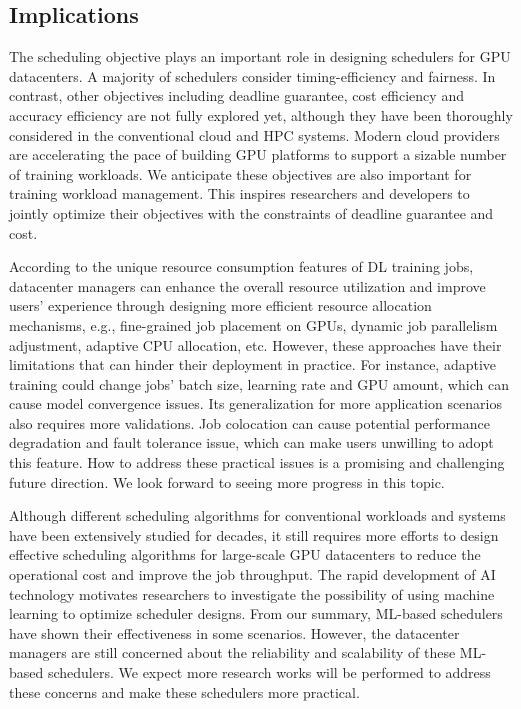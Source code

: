\subsection{Implications}
The scheduling objective plays an important role in designing schedulers for GPU datacenters. A majority of schedulers consider timing-efficiency and fairness. In contrast, other objectives including deadline guarantee, cost efficiency and accuracy efficiency are not fully explored yet, although they have been thoroughly considered in the conventional cloud and HPC systems. Modern cloud providers are accelerating the pace of building GPU platforms to support a sizable number of training workloads. We anticipate these objectives are also important for training workload management. This inspires researchers and developers to jointly optimize their objectives with the constraints of deadline guarantee and cost.



According to the unique resource consumption features of DL training jobs, datacenter managers can enhance the overall resource utilization and improve users' experience through designing more efficient resource allocation mechanisms, e.g., fine-grained job placement on GPUs, dynamic job parallelism adjustment, adaptive CPU allocation, etc. However, these approaches have their limitations that can hinder their deployment in practice. For instance, adaptive training could change jobs' batch size, learning rate and GPU amount, which can cause model convergence issues. Its generalization for more application scenarios also requires more validations. Job colocation can cause potential performance degradation and fault tolerance issue, which can make users unwilling to adopt this feature. How to address these practical issues is a promising and challenging future direction. We look forward to seeing more progress in this topic.

Although different scheduling algorithms for conventional workloads and systems have been extensively studied for decades, it still requires more efforts to design effective scheduling algorithms for large-scale GPU datacenters to reduce the operational cost and improve the job throughput. The rapid development of AI technology motivates researchers to investigate the possibility of using machine learning to optimize scheduler designs. From our summary, ML-based schedulers have shown their effectiveness in some scenarios. However, the datacenter managers are still concerned about the reliability and scalability of these ML-based schedulers. We expect more research works will be performed to address these concerns and make these schedulers more practical.



